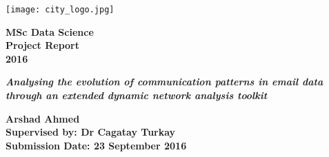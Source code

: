 \begin{titlepage}
    \begin{center}
        \vspace*{1cm}
        
        \huge
        \texttt{[image: city\_logo.jpg]}
        
        \textbf{MSc Data Science}\\
        \textbf{Project Report}\\
        \textbf{2016}\\
        
        \vspace{0.5cm}
        \Huge
        
        \textbf{\emph{Analysing the evolution of communication patterns in email data through an extended dynamic network analysis toolkit}}
        
        \vspace{1.5cm}
        
        \Huge
        \textbf{Arshad Ahmed}\\
        
        \vspace{1.5cm}
        \vfill
        \Large
        \textbf{
        Supervised by: Dr Cagatay Turkay\\
        Submission Date: 23 September 2016}
       
        
        
    \end{center}
      
\end{titlepage}